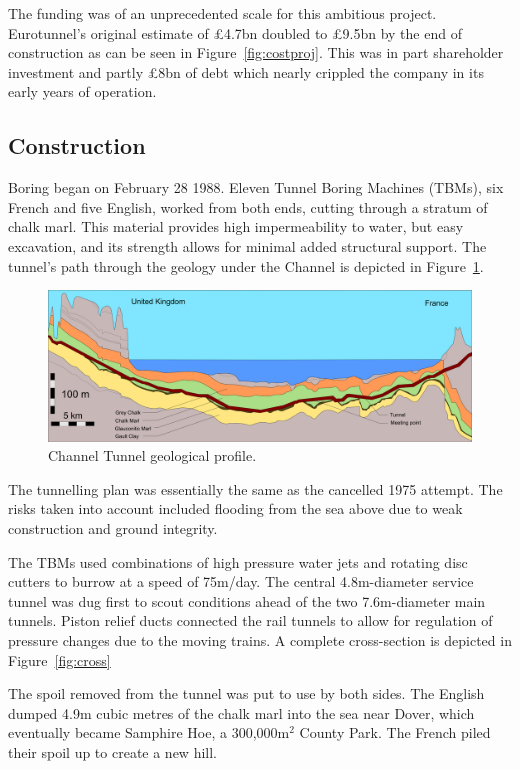 \documentclass[12pt]{article} %
\begin{document}
The funding  was of an unprecedented scale for this ambitious project. Eurotunnel's original estimate of £4.7bn doubled to £9.5bn by the end of construction as can be seen in Figure~\ref{fig:costproj}.\cite{costeval} This was in part shareholder investment and partly £8bn of debt which nearly crippled the company in its early years of operation.

\subsection{Construction}
Boring began on February 28 1988. Eleven Tunnel Boring Machines (TBMs), six French and five English, worked from both ends, cutting through a stratum of chalk marl. This material provides high impermeability to water, but easy excavation, and its strength allows for minimal added structural support. The tunnel's path through the geology under the Channel is depicted in Figure~\ref{fig:geo}.

\begin{figure}[tp]
  \centering
  \includegraphics[width=\textwidth]{geology}
  \caption{Channel Tunnel geological profile.}
  \label{fig:geo}
\end{figure}

The tunnelling plan was essentially the same as the cancelled 1975 attempt. The risks taken into account included flooding from the sea above due to weak construction and ground integrity.

The TBMs used combinations of high pressure water jets and rotating disc cutters to burrow at a speed of 75m/day. The central 4.8m-diameter service tunnel was dug first to scout conditions ahead of the two 7.6m-diameter main tunnels. Piston relief ducts connected the rail tunnels to allow for regulation of pressure changes due to the moving trains. A complete cross-section is depicted in Figure~\ref{fig:cross}

The spoil removed from the tunnel was put to use by both sides. The English dumped 4.9m cubic metres of the chalk marl into the sea near Dover, which eventually became Samphire Hoe, a 300,000m$^2$ County Park.\cite{samphoe} The French piled their spoil up to create a new hill.
\end{document}
